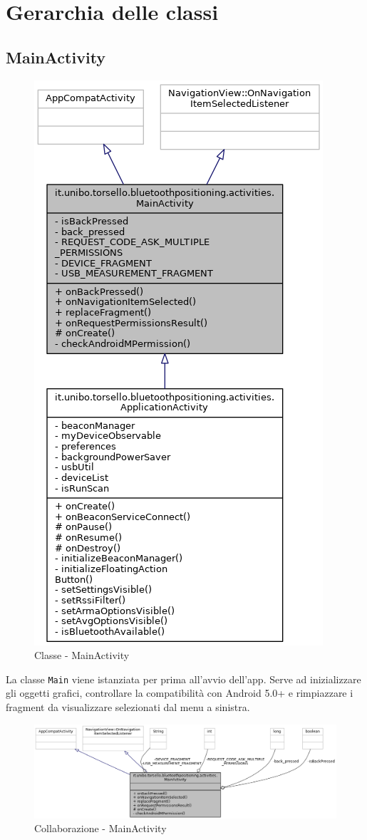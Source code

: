 \chapter{Gerarchia delle classi}

\section{MainActivity}
\begin{figure}[ph]
	\centering
	\includegraphics[width=0.40\linewidth]{img/uml/class/classit_1_1unibo_1_1torsello_1_1bluetoothpositioning_1_1activities_1_1MainActivity__inherit__graph.png}
	\caption{Classe - MainActivity}
\end{figure}
La classe \texttt{Main} viene istanziata per prima all'avvio dell'app. Serve ad inizializzare gli oggetti grafici, controllare la compatibilità con Android 5.0+ e rimpiazzare i fragment da visualizzare selezionati dal menu a sinistra.

\begin{figure}[ph]
	\centering
	\includegraphics[width=1.8\linewidth,angle=90]{img/uml/class/classit_1_1unibo_1_1torsello_1_1bluetoothpositioning_1_1activities_1_1MainActivity__coll__graph.png}
	\caption{Collaborazione - MainActivity}
\end{figure}

